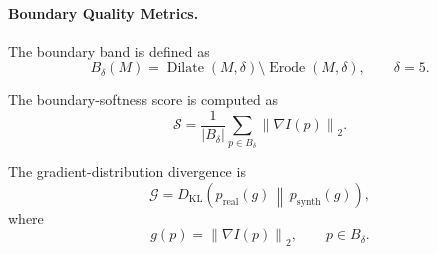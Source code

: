 \documentclass[journal]{IEEEtran}
\begin{document}
\paragraph{Boundary Quality Metrics.}
\label{sec:boundary_metric_protocol}
The boundary band is defined as
\begin{equation}
B_{\delta}(M)
=
\operatorname{Dilate}(M,\delta)
\setminus
\operatorname{Erode}(M,\delta),
\qquad \delta=5.
\label{eq:boundary_band_metric}
\end{equation}

The boundary-softness score is computed as
\begin{equation}
\mathcal{S}
=
\frac{1}{|B_{\delta}|}
\sum_{p\in B_{\delta}}
\left\lVert\nabla I(p)\right\rVert_2 .
\label{eq:boundary_softness}
\end{equation}

The gradient-distribution divergence is
\begin{equation}
\mathcal{G}
=
D_{\mathrm{KL}}
\left(
p_{\mathrm{real}}(g)
\,\middle\|\,
p_{\mathrm{synth}}(g)
\right),
\label{eq:gradient_divergence}
\end{equation}
where
\begin{equation}
g(p)=\left\lVert\nabla I(p)\right\rVert_2,
\qquad p\in B_{\delta}.
\label{eq:gradient_magnitude}
\end{equation}
\end{document}

